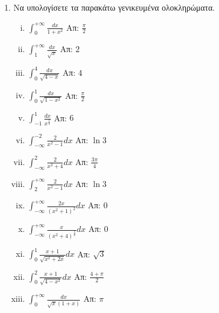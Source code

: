 \documentclass[a4paper,12pt]{article}
\begin{document}
\thispagestyle{empty}

\begin{center}
\end{center}

\vspace{\baselineskip}


\begin{enumerate}

\item Να υπολογίσετε τα παρακάτω γενικευμένα ολοκληρώματα.

\begin{enumerate}[i)]

\item $\int_{0}^{+\infty} \frac{dx}{1+x^2}$ \hfill Απ: $\frac{\pi}{2}$

\item $\int_{1}^{+\infty}\frac{dx}{\sqrt{x}}$ \hfill Απ: $2$

\item $\int_{0}^{4}\frac{dx}{\sqrt{4-x}}$ \hfill Απ: $4$

\item $\int_{0}^{1}\frac{dx}{\sqrt{1-x^2}}$ \hfill Απ: $\frac{\pi}{2}$

\item $\int_{-1}^{1}\frac{dx}{x^{\frac{2}{3}}}$ \hfill Απ: $6$

\item $\int_{-\infty}^{-2}\frac{2}{x^2-1}dx$ \hfill Απ: $\ln 3$

\item $\int_{-\infty}^{2}\frac{2}{x^2+4}dx$ \hfill Απ: $\frac{3\pi}{4}$

\item $\int_{2}^{+\infty}\frac{2}{x^2-1}dx$ \hfill Απ: $\ln 3$

\item $\int_{-\infty}^{+\infty}\frac{2x}{(x^2+1)^2}dx$ \hfill Απ: $0$

\item $\int_{-\infty}^{+\infty}\frac{x}{(x^2+4)^{\frac{3}{2}}}dx$ \hfill Απ: $0$

\item $\int_{0}^{1}\frac{x+1}{\sqrt{x^2+2x}}dx$ \hfill Απ: $\sqrt{3}$

\item $\int_{0}^{2}\frac{x+1}{\sqrt{4-x^2}}dx$ \hfill Απ: $\frac{4+\pi}{2}$

\item $\int_{0}^{+\infty}\frac{dx}{\sqrt{x}(1+x)}$ \hfill Απ: $\pi$


\end{enumerate}
\end{enumerate}
\end{document}
